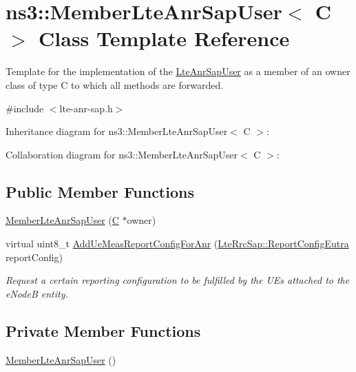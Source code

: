 \hypertarget{classns3_1_1MemberLteAnrSapUser}{}\section{ns3\+:\+:Member\+Lte\+Anr\+Sap\+User$<$ C $>$ Class Template Reference}
\label{classns3_1_1MemberLteAnrSapUser}


Template for the implementation of the \hyperlink{classns3_1_1LteAnrSapUser}{Lte\+Anr\+Sap\+User} as a member of an owner class of type C to which all methods are forwarded.  




{\ttfamily \#include $<$lte-\/anr-\/sap.\+h$>$}



Inheritance diagram for ns3\+:\+:Member\+Lte\+Anr\+Sap\+User$<$ C $>$\+:


Collaboration diagram for ns3\+:\+:Member\+Lte\+Anr\+Sap\+User$<$ C $>$\+:
\subsection*{Public Member Functions}
\begin{DoxyCompactItemize}
\item 
\hyperlink{classns3_1_1MemberLteAnrSapUser_a9edabd6088920521bbbda6c14289c0d5}{Member\+Lte\+Anr\+Sap\+User} (\hyperlink{loss__COST231__small__cities__urban_8m_aaa53ca0b650dfd85c4f59fa156f7a2cc}{C} $\ast$owner)
\item 
virtual uint8\+\_\+t \hyperlink{classns3_1_1MemberLteAnrSapUser_ac2187fbcd8346d540b543c58d006acf4}{Add\+Ue\+Meas\+Report\+Config\+For\+Anr} (\hyperlink{structns3_1_1LteRrcSap_1_1ReportConfigEutra}{Lte\+Rrc\+Sap\+::\+Report\+Config\+Eutra} report\+Config)
\begin{DoxyCompactList}\small\item\em Request a certain reporting configuration to be fulfilled by the U\+Es attached to the e\+NodeB entity. \end{DoxyCompactList}\end{DoxyCompactItemize}
\subsection*{Private Member Functions}
\begin{DoxyCompactItemize}
\item 
\hyperlink{classns3_1_1MemberLteAnrSapUser_a6cbb5869689796a37bb6920a9f377024}{Member\+Lte\+Anr\+Sap\+User} ()
\end{DoxyCompactItemize}
